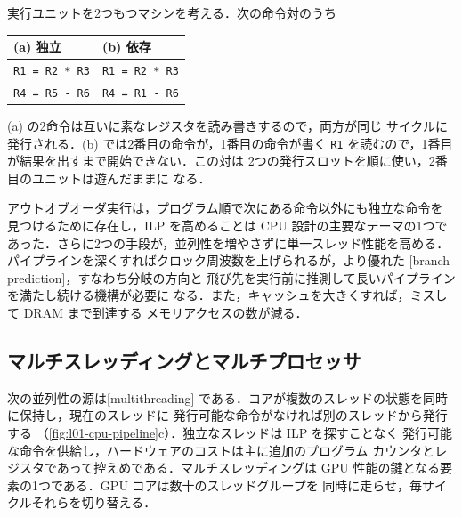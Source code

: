 \documentclass[../main.tex]{subfiles}
\begin{document}
\begin{example}
  \label{ex:l01-ilp}
  実行ユニットを2つもつマシンを考える．次の命令対のうち
  \begin{center}
    \begin{tabular}{ll}
      \toprule
      (a) 独立 & (b) 依存 \\
      \midrule
      \texttt{R1 = R2 * R3} & \texttt{R1 = R2 * R3} \\
      \texttt{R4 = R5 - R6} & \texttt{R4 = R1 - R6} \\
      \bottomrule
    \end{tabular}
  \end{center}
  (a) の2命令は互いに素なレジスタを読み書きするので，両方が同じ
  サイクルに発行される．(b) では2番目の命令が，1番目の命令が書く
  \texttt{R1} を読むので，1番目が結果を出すまで開始できない．この対は
  2つの発行スロットを順に使い，2番目のユニットは遊んだままに
  なる．
\end{example}

アウトオブオーダ実行は，プログラム順で次にある命令以外にも独立な命令を
見つけるために存在し，ILP を高めることは CPU 設計の主要なテーマの1つで
あった．さらに2つの手段が，並列性を増やさずに単一スレッド性能を高める．
パイプラインを深くすればクロック周波数を上げられるが，より優れた
[branch prediction]，すなわち分岐の方向と
飛び先を実行前に推測して長いパイプラインを満たし続ける機構が必要に
なる．また，キャッシュを大きくすれば，ミスして DRAM まで到達する
メモリアクセスの数が減る．

\subsection{マルチスレッディングとマルチプロセッサ}

次の並列性の源は[multithreading]
である．コアが複数のスレッドの状態を同時に保持し，現在のスレッドに
発行可能な命令がなければ別のスレッドから発行する
（\cref{fig:l01-cpu-pipeline}c）．独立なスレッドは ILP を探すことなく
発行可能な命令を供給し，ハードウェアのコストは主に追加のプログラム
カウンタとレジスタであって控えめである．マルチスレッディングは GPU
性能の鍵となる要素の1つである．GPU コアは数十のスレッドグループを
同時に走らせ，毎サイクルそれらを切り替える．
\end{document}
